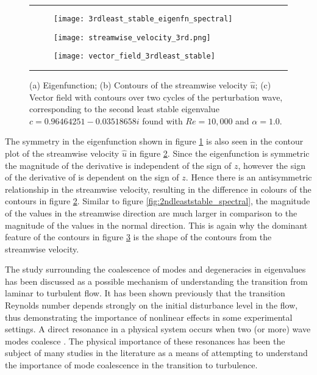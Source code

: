 \documentclass[a4paper, 12pt, twoside, openright]{article}
\numberwithin{equation}{section}
\begin{document}
\begin{figure}[H]
\rule{\linewidth}{1.5pt}
\begin{subfigure}[b]{0.5\textwidth}
\texttt{[image: 3rdleast\_stable\_eigenfn\_spectral]}\hfill
\caption{\label{fig:3rdleast_stable_eigenfn_spectral}}
\end{subfigure}
\begin{subfigure}[b]{0.5\textwidth}
\texttt{[image: streamwise\_velocity\_3rd.png]}\hfill
\caption{\label{fig:streamwise_velocity_3rd}}
\end{subfigure}
\begin{subfigure}[b]{1.0\textwidth}
\texttt{[image: vector\_field\_3rdleast\_stable]}\hfill
\caption{\label{fig:vector_field_3rdleast_stable}}
\end{subfigure}
\caption{(a) Eigenfunction; (b) Contours of the streamwise velocity $\hat u$; (c) Vector field with contours over two cycles of the perturbation wave, corresponding to the second least stable eigenvalue $c = 0.96464251 - 0.03518658i$ found with $Re=10,000$ and $\alpha=1.0$.\label{fig:3rd_leaststable}}
\rule{\linewidth}{1.5pt}
\end{figure}

The symmetry in the eigenfunction shown in figure \ref{fig:3rdleast_stable_eigenfn_spectral} is also seen in the contour plot of the streamwise velocity $\hat u$ in figure \ref{fig:streamwise_velocity_3rd}. Since the eigenfunction is symmetric the magnitude of the derivative is independent of the sign of $z$, however the sign of the derivative of is dependent on the sign of $z$. Hence there is an antisymmetric relationship in the streamwise velocity, resulting in the difference in colours of the contours in figure \ref{fig:streamwise_velocity_3rd}. Similar to figure \ref{fig:2ndleaststable_spectral}, the magnitude of the values in the streamwise direction are much larger in comparison to the magnitude of the values in the normal direction. This is again why the dominant feature of the contours in figure \ref{fig:vector_field_3rdleast_stable} is the shape of the contours from the streamwise velocity. %

The study surrounding the coalescence of modes and degeneracies in eigenvalues has been discussed as a possible mechanism of understanding the transition from laminar to turbulent flow. It has been shown previously that the transition Reynolds number depends strongly on the initial disturbance level in the flow, thus demonstrating the importance of nonlinear effects in some experimental settings. A direct resonance in a physical system occurs when two (or more) wave modes coalesce \citep{Koch86}. The physical importance of these resonances has been the subject of many studies in the literature as a means of attempting to understand the importance of mode coalescence in the transition to turbulence. %
\end{document}
